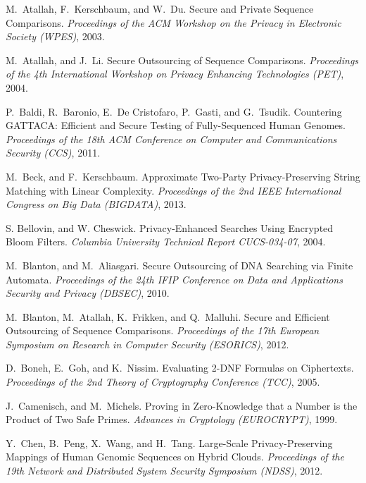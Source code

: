 \documentclass{llncs}
\begin{document}
\begin{thebibliography}{10}

M.~Atallah, F.~Kerschbaum, and W.~Du.
Secure and Private Sequence Comparisons.
{\em Proceedings of the ACM Workshop on the Privacy in Electronic Society (WPES)},
2003.

M.~Atallah, and J.~Li.
Secure Outsourcing of Sequence Comparisons.
{\em Proceedings of the 4th International Workshop on Privacy Enhancing Technologies (PET)},
2004.

P.~Baldi, R.~Baronio, E.~De Cristofaro, P.~Gasti, and G.~Tsudik.
Countering GATTACA: Efficient and Secure Testing of Fully-Sequenced Human Genomes.
{\em Proceedings of the 18th ACM Conference on Computer and Communications Security (CCS)},
2011.

M.~Beck, and F.~Kerschbaum.
Approximate Two-Party Privacy-Preserving String Matching with Linear Complexity.
{\em Proceedings of the 2nd IEEE International Congress on Big Data (BIGDATA)},
2013.

S. Bellovin, and W. Cheswick.
Privacy-Enhanced Searches Using Encrypted Bloom Filters.
{\em Columbia University Technical Report CUCS-034-07},
2004.

M.~Blanton, and M.~Aliasgari.
Secure Outsourcing of DNA Searching via Finite Automata.
{\em Proceedings of the 24th IFIP Conference on Data and Applications Security and Privacy (DBSEC)},
2010.

M.~Blanton, M.~Atallah, K.~Frikken, and Q.~Malluhi.
Secure and Efficient Outsourcing of Sequence Comparisons.
{\em Proceedings of the 17th European Symposium on Research in Computer Security (ESORICS)},
2012.

D.~Boneh, E.~Goh, and K.~Nissim.
Evaluating 2-DNF Formulas on Ciphertexts.
{\em Proceedings of the 2nd Theory of Cryptography Conference (TCC)},
2005.



J.~Camenisch, and M.~Michels.
Proving in Zero-Knowledge that a Number is the Product of Two Safe Primes.
{\em Advances in Cryptology (EUROCRYPT)},
1999.

Y.~Chen, B.~Peng, X.~Wang, and H.~Tang.
Large-Scale Privacy-Preserving Mappings of Human Genomic Sequences on Hybrid Clouds.
{\em Proceedings of the 19th Network and Distributed System Security Symposium (NDSS)},
2012.


\end{thebibliography}
\end{document}
